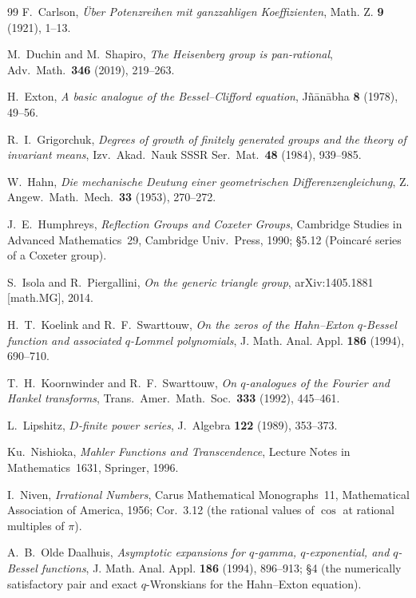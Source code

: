 \documentclass[11pt]{article}
\theoremstyle{plain}
\theoremstyle{definition}
\theoremstyle{remark}
\theoremstyle{plain}\newtheorem*{maintheorem}{Main Theorem}
\begin{document}
\begin{thebibliography}{99}
 F.~Carlson, \emph{\"Uber Potenzreihen mit ganzzahligen Koeffizienten},
Math. Z. \textbf{9} (1921), 1--13.

 M.~Duchin and M.~Shapiro, \emph{The Heisenberg group is pan-rational},
Adv.\ Math.\ \textbf{346} (2019), 219--263.

 H.~Exton, \emph{A basic analogue of the Bessel--Clifford equation},
J\~n\=an\=abha \textbf{8} (1978), 49--56.

 R.~I.~Grigorchuk, \emph{Degrees of growth of finitely generated groups
and the theory of invariant means}, Izv.\ Akad.\ Nauk SSSR Ser.\ Mat.\ \textbf{48} (1984),
939--985.

 W.~Hahn, \emph{Die mechanische Deutung einer geometrischen
Differenzengleichung}, Z. Angew.\ Math.\ Mech.\ \textbf{33} (1953), 270--272.

 J.~E.~Humphreys, \emph{Reflection Groups and Coxeter Groups}, Cambridge
Studies in Advanced Mathematics~29, Cambridge Univ.\ Press, 1990; \S5.12 (Poincar\'e series of a
Coxeter group).

 S.~Isola and R.~Piergallini, \emph{On the generic triangle group},
arXiv:1405.1881 [math.MG], 2014.

 H.~T.~Koelink and R.~F.~Swarttouw, \emph{On the zeros of the
Hahn--Exton $q$-Bessel function and associated $q$-Lommel polynomials}, J. Math. Anal. Appl.
\textbf{186} (1994), 690--710.

 T.~H.~Koornwinder and R.~F.~Swarttouw, \emph{On $q$-analogues of the Fourier and
Hankel transforms}, Trans.\ Amer.\ Math.\ Soc.\ \textbf{333} (1992), 445--461.

 L.~Lipshitz, \emph{$D$-finite power series}, J.~Algebra \textbf{122} (1989),
353--373.

 Ku.~Nishioka, \emph{Mahler Functions and Transcendence}, Lecture Notes in
Mathematics~1631, Springer, 1996.

 I.~Niven, \emph{Irrational Numbers}, Carus Mathematical Monographs~11,
Mathematical Association of America, 1956; Cor.~3.12 (the rational values of $\cos$ at rational
multiples of $\pi$).

 A.~B.~Olde Daalhuis, \emph{Asymptotic expansions for $q$-gamma, $q$-exponential,
and $q$-Bessel functions}, J. Math. Anal. Appl. \textbf{186} (1994), 896--913; \S4 (the numerically
satisfactory pair and exact $q$-Wronskians for the Hahn--Exton equation).


\end{thebibliography}
\end{document}
